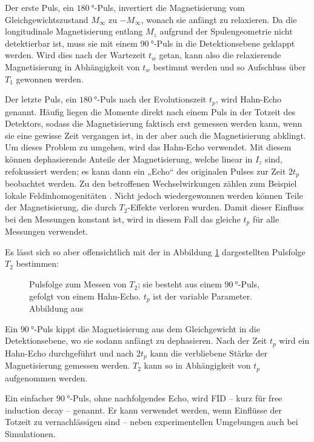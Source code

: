 Der erste Puls, ein $\SI{180}{\degree}$-Puls, invertiert die Magnetisierung vom Gleichgewichtszustand $M_\infty$ zu $-M_\infty$, wonach sie anfängt zu relaxieren. Da die longitudinale Magnetisierung entlang $M_z$ aufgrund der Spulengeometrie nicht detektierbar ist, muss sie mit einem $\SI{90}{\degree}$-Puls in die Detektionsebene geklappt werden. Wird dies nach der Wartezeit $t_w$ getan, kann also die relaxierende Magnetisierung in Abhängigkeit von $t_w$ bestimmt werden und so Aufschluss über $T_1$ gewonnen werden.

Der letzte Puls, ein $\SI{180}{\degree}$-Puls nach der Evolutionszeit $t_p$, wird Hahn-Echo genannt. Häufig liegen die Momente direkt nach einem Puls in der Totzeit des Detektors, sodass die Magnetisierung faktisch erst gemessen werden kann, wenn sie eine gewisse Zeit vergangen ist, in der aber auch die Magnetisierung abklingt. Um dieses Problem zu umgehen, wird das Hahn-Echo verwendet. Mit diesem können dephasierende Anteile der Magnetisierung, welche linear in $I_z$ sind, refokussiert werden; es kann dann ein „Echo“ des originalen Pulses zur Zeit $2 t_p$ beobachtet werden. Zu den betroffenen Wechselwirkungen zählen zum Beispiel lokale Feldinhomogenitäten \cite[S.302]{levitt}. Nicht jedoch wiedergewonnen werden können Teile der Magnetisierung, die durch $T_2$-Effekte verloren wurden. Damit dieser Einfluss bei den Messungen konstant ist, wird in diesem Fall das gleiche $t_p$ für alle Messungen verwendet.

Es lässt sich so aber offensichtlich mit der in Abbildung \ref{fig:theo:pulsT2} dargestellten Pulsfolge $T_2$ bestimmen:
\begin{figure}
	\begin{center}
		
	\end{center}
	\caption{Pulsfolge zum Messen von $T_2$; sie besteht aus einem $\SI{90}{\degree}$-Puls, gefolgt von einem Hahn-Echo. $t_p$ ist der variable Parameter. Abbildung aus \cite{joachim_master}}\label{fig:theo:pulsT2}
\end{figure}
Ein $\SI{90}{\degree}$-Puls kippt die Magnetisierung aus dem Gleichgewicht in die Detektionsebene, wo sie sodann anfängt zu dephasieren. Nach der Zeit $t_p$ wird ein Hahn-Echo durchgeführt und nach $2 t_p$ kann die verbliebene Stärke der Magnetisierung gemessen werden. $T_2$ kann so in Abhängigkeit von $t_p$ aufgenommen werden.

Ein einfacher $\SI{90}{\degree}$-Puls, ohne nachfolgendes Echo, wird FID -- kurz für free induction decay -- genannt. Er kann verwendet werden, wenn Einflüsse der Totzeit zu vernachlässigen sind -- neben experimentellen Umgebungen auch bei Simulationen.

